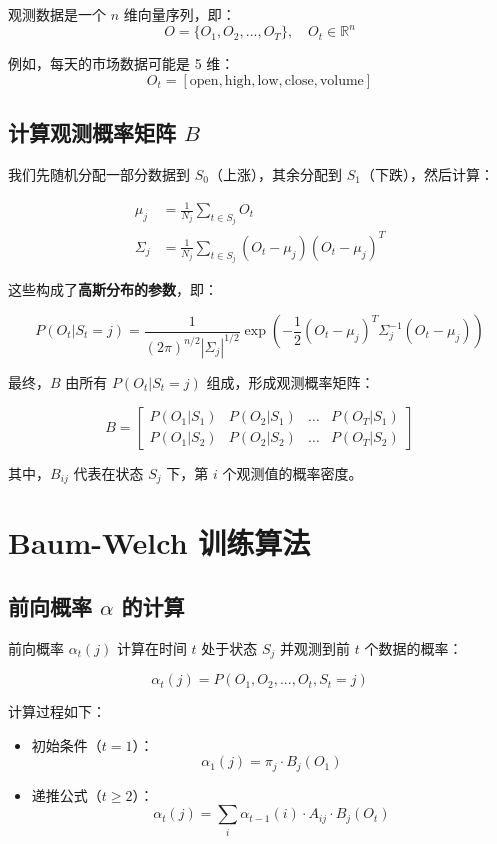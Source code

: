 \documentclass{article}
\begin{document}
观测数据是一个 $n$ 维向量序列，即：
\[
O = \{ O_1, O_2, ..., O_T \}, \quad O_t \in \mathbb{R}^n
\]

例如，每天的市场数据可能是 5 维：
\[
O_t = [\text{open}, \text{high}, \text{low}, \text{close}, \text{volume}]
\]

\subsection{计算观测概率矩阵 $B$}

我们先随机分配一部分数据到 $S_0$（上涨），其余分配到 $S_1$（下跌），然后计算：

\begin{align}
    \mu_j &= \frac{1}{N_j} \sum_{t \in S_j} O_t \\
    \Sigma_j &= \frac{1}{N_j} \sum_{t \in S_j} (O_t - \mu_j)(O_t - \mu_j)^T
\end{align}

这些构成了\textbf{高斯分布的参数}，即：

\[
P(O_t | S_t = j) = \frac{1}{(2\pi)^{n/2} |\Sigma_j|^{1/2}} \exp \left( -\frac{1}{2} (O_t - \mu_j)^T \Sigma_j^{-1} (O_t - \mu_j) \right)
\]

最终，$B$ 由所有 $P(O_t | S_t = j)$ 组成，形成观测概率矩阵：

\[
B =
\begin{bmatrix}
P(O_1 | S_1) & P(O_2 | S_1) & \dots & P(O_T | S_1) \\
P(O_1 | S_2) & P(O_2 | S_2) & \dots & P(O_T | S_2)
\end{bmatrix}
\]

其中，$B_{ij}$ 代表在状态 $S_j$ 下，第 $i$ 个观测值的概率密度。

\section{Baum-Welch 训练算法}

\subsection{前向概率 $\alpha$ 的计算}

前向概率 $\alpha_t(j)$ 计算在时间 $t$ 处于状态 $S_j$ 并观测到前 $t$ 个数据的概率：

\[
\alpha_t(j) = P(O_1, O_2, ..., O_t, S_t = j)
\]

计算过程如下：

\begin{itemize}
    \item 初始条件（$t=1$）：
    \[
    \alpha_1(j) = \pi_j \cdot B_j(O_1)
    \]
    \item 递推公式（$t \geq 2$）：
    \[
    \alpha_t(j) = \sum_{i} \alpha_{t-1}(i) \cdot A_{ij} \cdot B_j(O_t)
    \]
\end{itemize}
\end{document}
